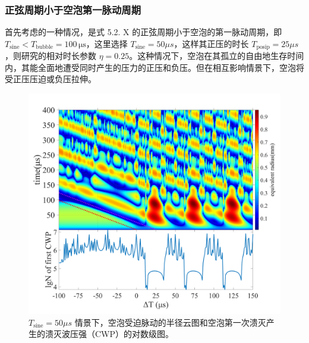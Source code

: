 \subsubsection{
正弦周期小于空泡第一脉动周期}

首先考虑的一种情况，是式 5.2. X 的正弦周期小于空泡的第一脉动周期，即
$T_\mathrm{sine}<T_\mathrm {bubble }=100\,\mathrm\mu \mathrm s$，这里选择
$T_\mathrm{sine}=50 \mu s$，这样其正压的时长
$T_\mathrm{posip}=25\mu s$，则研究的相对时长参数
$\eta =0.25$。这种情况下，空泡在其孤立的自由地生存时间内，其能全面地遭受同时产生的压力的正压和负压。但在相互影响情景下，空泡将受正压压迫或负压拉伸。

\begin{figure}[H]
  \centering
  \includegraphics[width=0.9\linewidth]{img/fig5.20-eps-converted-to.pdf}
  \caption{$T_\mathrm{sine}=50 \mu s$
情景下，空泡受迫脉动的半径云图和空泡第一次溃灭产生的溃灭波压强（CWP）的对数级图。}
  \label{fig:5.20}
\end{figure}



